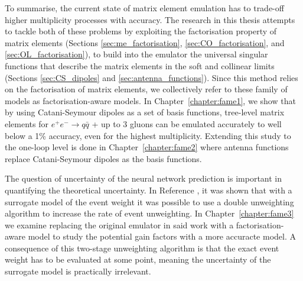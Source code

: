 \documentclass[main.tex]{subfiles}
\begin{document}
    To summarise, the current state of matrix element
    emulation has to trade-off higher multiplicity processes
    with accuracy. The research in this thesis attempts to
    tackle both of these problems by exploiting the factorisation
    property of matrix elements (Sections \ref{sec:me_factorisation},
    \ref{sec:CO_factorisation}, and \ref{sec:OL_factorisation}),
    to build into the emulator the universal singular functions
    that describe the matrix elements in the soft and collinear limits
    (Sections \ref{sec:CS_dipoles} and \ref{sec:antenna_functions}).
    Since this method relies on the factorisation of matrix
    elements, we collectively refer to these family of models
    as factorisation-aware models.
    In Chapter~\ref{chapter:fame1}, we show that by using
    Catani-Seymour dipoles as a set of basis functions, tree-level
    matrix elements for $e^{+}e^{-} \rightarrow q \bar{q}$ + up to 3 gluons
    can be emulated accurately to well below a 1\% accuracy,
    even for the highest multiplicity. Extending this study
    to the one-loop level is done in Chapter~\ref{chapter:fame2}
    where antenna functions replace Catani-Seymour dipoles as
    the basis functions.

    The question of uncertainty of the neural network
    prediction is important in quantifying the theoretical
    uncertainty. In Reference \cite{Danziger:2021eeg},
    it was shown that with a surrogate model of the event
    weight it was possible to use a double unweighting
    algorithm to increase the rate of event unweighting.
    In Chapter~\ref{chapter:fame3} we examine replacing
    the original emulator in said work with a factorisation-aware
    model to study the potential gain factors with a more
    accuracte model. A consequence of this two-stage unweighting
    algorithm is that the exact event weight has to be evaluated
    at some point, meaning the uncertainty of the surrogate
    model is practically irrelevant.
\end{document}
